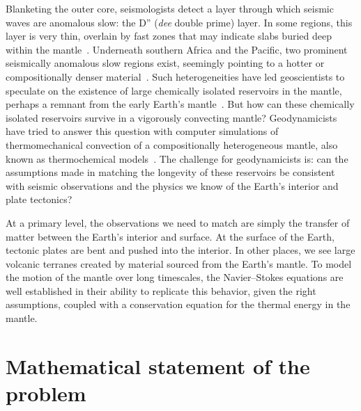 Blanketing the outer core, seismologists detect a layer through which
seismic waves are anomalous slow: the D'' (\emph{dee} double prime)
layer.  In some regions, this layer is very thin, overlain by fast
zones that may indicate slabs buried deep within the
mantle~\citep{McNamaraZhong2005}.  Underneath southern Africa and the
Pacific, two prominent seismically anomalous slow regions exist,
seemingly pointing to a hotter or compositionally denser
material~\citep{McNutt1998}. Such heterogeneities have led
geoscientists to speculate on the existence of large chemically
isolated reservoirs in the mantle, perhaps a remnant from the early
Earth's mantle~\citep{Burke2008}.  But how can these chemically
isolated reservoirs survive in a vigorously convecting mantle?
Geodynamicists have tried to answer this question with computer
simulations of thermomechanical convection of a compositionally
heterogeneous mantle, also known as thermochemical
models~\citep{McNamara2010}. The challenge for geodynamicists is: can
the assumptions made in matching the longevity of these reservoirs be
consistent with seismic observations and the physics we know of the
Earth's interior and plate tectonics?

At a primary level, the observations we need to match are simply the
transfer of matter between the Earth's interior and surface. At the
surface of the Earth, tectonic plates are bent and pushed into the
interior. In other places, we see large volcanic terranes created by
material sourced from the Earth's mantle. To model the motion of the
mantle over long timescales, the Navier--Stokes equations are well
established in their ability to replicate this behavior, given the
right assumptions, coupled with a conservation equation for the
thermal energy in the mantle.


\section{Mathematical statement of the problem}
\label{vynnytska:sec:maths}


